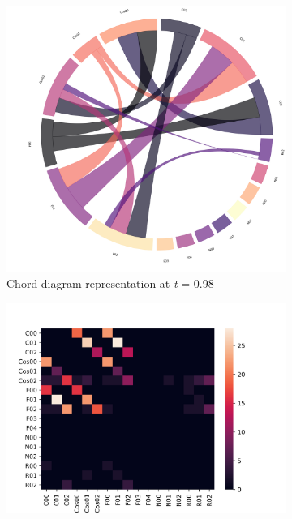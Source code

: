 \begin{figure}[!h]
	\centering
	\begin{subfigure}[b]{0.3\linewidth}
		\includegraphics[width=\linewidth]{figures/chords/chord_swap_ensemble1000_RCN5333300_097.png}
		\caption{Chord diagram representation at \emph{t} = 0.98}
	\end{subfigure}
	\hfill
	\begin{subfigure}[b]{0.3\linewidth}
		\includegraphics[width=\linewidth]{figures/heatmaps/heatmap_swap_ensemble1000_RCN5333300_097.png}

\end{subfigure}
\end{figure}
